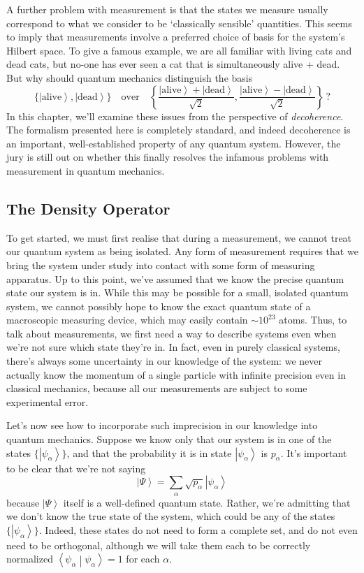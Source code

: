\documentclass{article}
\theoremstyle{plain}\theoremheaderfont{\normalfont\itshape}\theorembodyfont{\rmfamily}\theoremseparator{.}\newtheorem*{rem}{Remark}\newtheorem*{ex}{Example}\newtheorem*{proof}{Proof}\newtheorem*{altp}{Alternative proof}
\theoremstyle{plain}\theoremheaderfont{\normalfont\bfseries}\theorembodyfont{\rmfamily}\theoremseparator{.}\newtheorem{thm}{Theorem}[section]\newtheorem{lem}[thm]{Lemma}\newtheorem{prop}[thm]{Proposition}\newtheorem*{cor}{Corollary}\newtheorem{defn}[thm]{Definition}\newtheorem{clm}[thm]{Claim}\newtheorem{clminproof}{Claim}
\theoremstyle{break}\theoremheaderfont{\normalfont\itshape}\theorembodyfont{\rmfamily}\theoremseparator{.\medskip}\newtheorem*{proofskip}{Proof}\newtheorem*{exs}{Examples}\newtheorem*{rems}{Remarks}
\theoremstyle{break}\theoremheaderfont{\normalfont\bfseries}\theorembodyfont{\rmfamily}\theoremseparator{.\medskip}\newtheorem{lemskip}[thm]{Lemma}\newtheorem{defnskip}[thm]{Definition}\newtheorem{propskip}[thm]{Proposition}\newtheorem{thmskip}[thm]{Theorem}
\numberwithin{equation}{section}
\newcommand{\ket}[1]{\left| #1 \right\rangle}
\newcommand{\braket}[2]{\left\langle #1 \middle| #2 \right\rangle}
\begin{document}
    A further problem with measurement is that the states we measure usually correspond to what we consider to be `classically sensible' quantities. This seems to imply that measurements involve a preferred choice of basis for the system's Hilbert space. To give a famous example, we are all familiar with living cats and dead cats, but no-one has ever seen a cat that is simultaneously alive + dead. But why should quantum mechanics distinguish the basis
    \begin{equation}
        \{\ket{\text{alive}},\ket{\text{dead}}\}\quad\text{over}\quad\left\{\frac{\ket{\text{alive}}+\ket{\text{dead}}}{\sqrt{2}},\frac{\ket{\text{alive}}-\ket{\text{dead}}}{\sqrt{2}}\right\}\,?
    \end{equation}
    In this chapter, we'll examine these issues from the perspective of \textit{decoherence}. The formalism presented here is completely standard, and indeed decoherence is an important, well-established property of any quantum system. However, the jury is still out on whether this finally resolves the infamous problems with measurement in quantum mechanics.

    \subsection{The Density Operator}
    To get started, we must first realise that during a measurement, we cannot treat our quantum system as being isolated. Any form of measurement requires that we bring the system under study into contact with some form of measuring apparatus. Up to this point, we've assumed that we know the precise quantum state our system is in. While this may be possible for a small, isolated quantum system, we cannot possibly hope to know the exact quantum state of a macroscopic measuring device, which may easily contain \(\sim10^{23}\) atoms. Thus, to talk about measurements, we first need a way to describe systems even when we're not sure which state they're in. In fact, even in purely classical systems, there's always some uncertainty in our knowledge of the system: we never actually know the momentum of a single particle with infinite precision even in classical mechanics, because all our measurements are subject to some experimental error.

    Let's now see how to incorporate such imprecision in our knowledge into quantum mechanics. Suppose we know only that our system is in one of the states \(\{\ket{\psi_\alpha}\}\), and that the probability it is in state \(\ket{\psi_\alpha}\) is \(p_\alpha\). It's important to be clear that we're not saying
    \begin{equation}
        \ket{\Psi}=\sum_\alpha\sqrt{p_\alpha}\ket{\psi_\alpha}
    \end{equation}
    because \(\ket{\Psi}\) itself is a well-defined quantum state. Rather, we're admitting that we don't know the true state of the system, which could be any of the states \(\{\ket{\psi_\alpha}\}\). Indeed, these states do not need to form a complete set, and do not even need to be orthogonal, although we will take them each to be correctly normalized \(\braket{\psi_\alpha}{\psi_\alpha}=1\) for each \(\alpha\).
\end{document}
